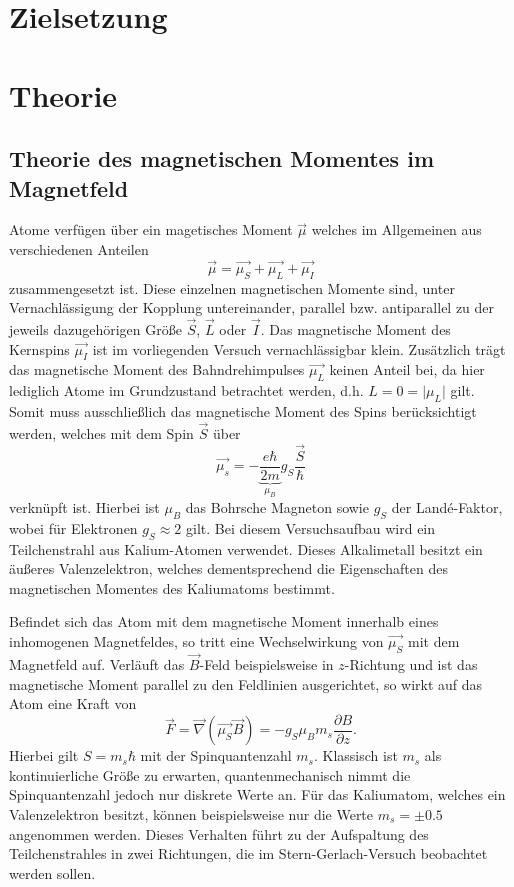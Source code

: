 \section{Zielsetzung}

\section{Theorie}
\subsection{Theorie des magnetischen Momentes im Magnetfeld}
\label{sec:Theorie}
Atome verfügen über ein magetisches Moment $\vec{\mu}$ welches im Allgemeinen aus verschiedenen Anteilen
\begin{equation}
  \vec{\mu} = \vec{\mu_S} + \vec{\mu_L} + \vec{\mu_I}
\end{equation}
zusammengesetzt ist.
Diese einzelnen magnetischen Momente sind, unter Vernachlässigung der Kopplung untereinander, parallel bzw. antiparallel zu der jeweils dazugehörigen Größe $\vec{S}$, $\vec{L}$ oder $\vec{I}$.
Das magnetische Moment des Kernspins $\vec{\mu_I}$ ist im vorliegenden Versuch vernachlässigbar klein.
Zusätzlich trägt das magnetische Moment des Bahndrehimpulses $\vec{\mu_L}$ keinen Anteil bei, da hier lediglich Atome im Grundzustand betrachtet werden, d.h. $L = 0 = \lvert \mu_L \rvert$ gilt.
Somit muss ausschließlich das magnetische Moment des Spins berücksichtigt werden, welches mit dem Spin $\vec{S}$ über
\begin{equation}
  \vec{\mu_s} = - \underbrace{\frac{e \hbar}{2m}}_{\mu_B} g_S \frac{\vec{S}}{\hbar}
\end{equation}
verknüpft ist.
Hierbei ist $\mu_B$ das Bohrsche Magneton sowie $g_S$ der Land\'{e}-Faktor, wobei für Elektronen $g_S \approx 2$ gilt.
Bei diesem Versuchsaufbau wird ein Teilchenstrahl aus Kalium-Atomen verwendet.
Dieses Alkalimetall besitzt ein äußeres Valenzelektron, welches dementsprechend die Eigenschaften des magnetischen Momentes des Kaliumatoms bestimmt.

Befindet sich das Atom mit dem magnetische Moment innerhalb eines inhomogenen Magnetfeldes, so tritt eine Wechselwirkung von $\vec{\mu_S}$ mit dem Magnetfeld auf.
Verläuft das $\vec{B}$-Feld beispielsweise in $z$-Richtung und ist das magnetische Moment parallel zu den Feldlinien ausgerichtet, so wirkt auf das Atom eine Kraft von
\begin{equation}
  \vec{F} = \vec{\nabla}\!\left( \vec{\mu_S} \vec{B} \right) = -g_S \mu_B m_s \frac{\partial B}{\partial z}.
\end{equation}
Hierbei gilt $S=m_s \hbar$ mit der Spinquantenzahl $m_s$.
Klassisch ist $m_s$ als kontinuierliche Größe zu erwarten, quantenmechanisch nimmt die Spinquantenzahl jedoch nur diskrete Werte an.
Für das Kaliumatom, welches ein Valenzelektron besitzt, können beispielsweise nur die Werte $m_s = \pm \num{0.5}$ angenommen werden.
Dieses Verhalten führt zu der Aufspaltung des Teilchenstrahles in zwei Richtungen, die im Stern-Gerlach-Versuch beobachtet werden sollen.

